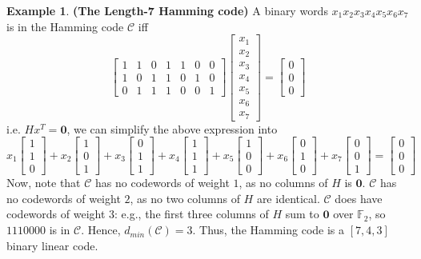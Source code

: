 \documentclass[12pt, oneside]{book}
\theoremstyle{definition}
\theoremstyle{definition}
\newtheorem{example}{Example}[section]
\theoremstyle{remark}
\begin{document}
\begin{example}
    \textbf{(The Length-7 Hamming code)} A binary words $x_1x_2x_3x_4x_5x_6x_7$ is in the Hamming code $\mathcal{C}$ iff
    \[
    \begin{bmatrix}
        1 &1 & 0 & 1 & 1 & 0 & 0 \\
        1 & 0 & 1 & 1 & 0 & 1 & 0 \\
        0 & 1 & 1 & 1 & 0 & 0 & 1
    \end{bmatrix}
    \begin{bmatrix}
        x_1 \\ x_2 \\ x_3 \\ x_4 \\ x_5 \\x_6 \\ x_7 
    \end{bmatrix}
    =\begin{bmatrix} 0 \\ 0 \\ 0 \end{bmatrix}
    \]
    i.e. $Hx^T=\mathbf{0}$, we can simplify the above expression into
    \[
    x_1\begin{bmatrix} 1\\1\\0\end{bmatrix} + x_2\begin{bmatrix} 1\\0\\1\end{bmatrix}
    +x_3\begin{bmatrix}0 \\ 1 \\ 1 \end{bmatrix} + x_4\begin{bmatrix}
        1\\1\\1
    \end{bmatrix} + x_5 \begin{bmatrix} 1\\0\\0\end{bmatrix} +x_6\begin{bmatrix}0\\1\\0\end{bmatrix} +x_7\begin{bmatrix}0\\0\\1\end{bmatrix} =\begin{bmatrix} 0 \\ 0 \\ 0 \end{bmatrix}
    \]
    Now, note that $\mathcal{C}$ has no codewords of weight $1$, as no columns of $H$ is $\mathbf{0}$. $\mathcal{C}$ has no codewords of weight $2$, as no two columns of $H$ are identical. $\mathcal{C}$ does have codewords of weight $3$: e.g., the first three columns of $H$ sum to $\mathbf{0}$ over $\mathbb{F}_2$, so $1110000$ is in $\mathcal{C}$. Hence, $d_{min}(\mathcal{C})=3$. Thus, the Hamming code is a $[7,4,3]$ binary linear code.
\end{example}
\end{document}
